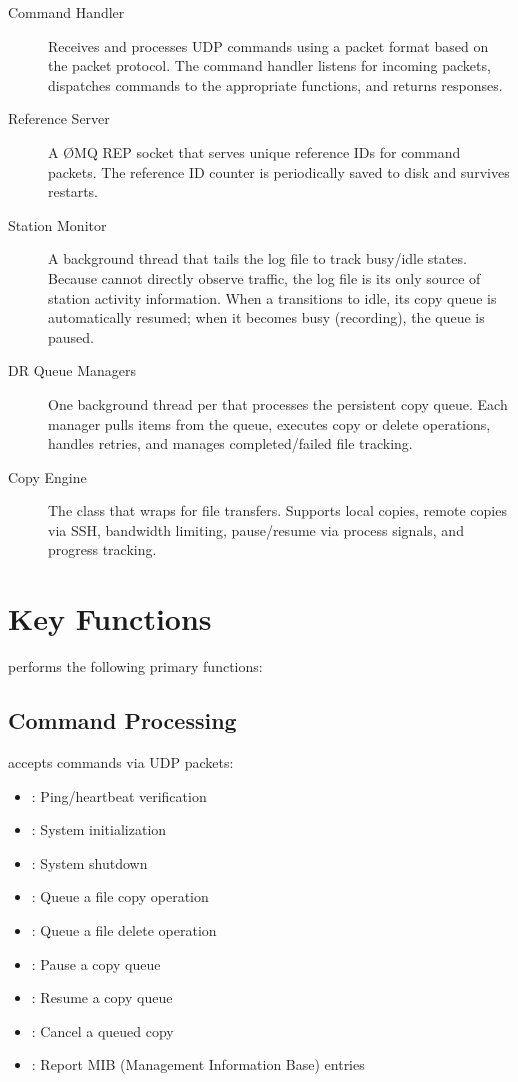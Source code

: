 \begin{description}
    \item[Command Handler] Receives and processes UDP commands using a packet format based on the \MCS{} packet protocol. The command handler listens for incoming packets, dispatches commands to the appropriate functions, and returns responses.

    \item[Reference Server] A \O{}MQ REP socket that serves unique reference IDs for command packets. The reference ID counter is periodically saved to disk and survives restarts.

    \item[Station Monitor] A background thread that tails the \MCS{}  log file to track \DR{} busy/idle states. Because \SC{} cannot directly observe \MCS{} traffic, the log file is its only source of station activity information. When a \DR{} transitions to idle, its copy queue is automatically resumed; when it becomes busy (recording), the queue is paused.

    \item[DR Queue Managers] One background thread per \DR{} that processes the persistent copy queue. Each manager pulls items from the queue, executes copy or delete operations, handles retries, and manages completed/failed file tracking.

    \item[Copy Engine] The  class that wraps  for file transfers. Supports local copies, remote copies via SSH, bandwidth limiting, pause/resume via process signals, and progress tracking.
\end{description}

\section{Key Functions}

\SC{} performs the following primary functions:

\subsection{Command Processing}

\SC{} accepts commands via UDP packets:
\begin{itemize}
    \item {}: Ping/heartbeat verification
    \item {}: System initialization
    \item {}: System shutdown
    \item {}: Queue a file copy operation
    \item {}: Queue a file delete operation
    \item {}: Pause a \DR{} copy queue
    \item {}: Resume a \DR{} copy queue
    \item {}: Cancel a queued copy
    \item {}: Report MIB (Management Information Base) entries
\end{itemize}

